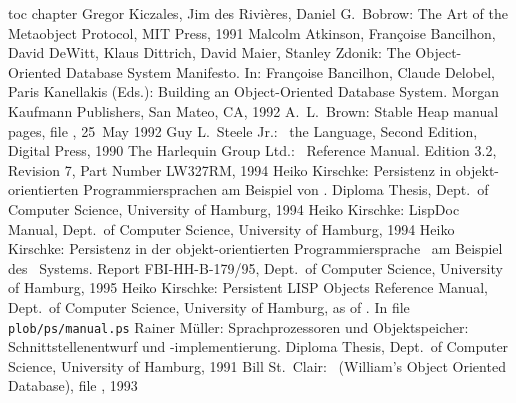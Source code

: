 %
\cleardoublepage
%
\newcommand{\etal}{et al.\ }
\newcommand{\infile}[1]{In file \texttt{#1}}
%
\begin{thebibliography}{XXXXXXXXXXXX}
\addcontentsline%
 {toc}%
 {chapter}%
 {\protect\numberline{}{\protect\bibname}}%
%
Gregor Kiczales, Jim des Rivi\`{e}res, Daniel G.\ Bobrow:
The Art of the Metaobject Protocol,
MIT Press, 1991
%
\bibitem[Atkinson \etal\ 92]{bib:Atkinson-et-al-92}
Malcolm Atkinson, Fran\c{c}oise Bancilhon, David DeWitt, Klaus
Dittrich, David Maier, Stanley Zdonik:
The Object-Oriented Database System Manifesto.
In: \cite[]{bib:Bancilhon-et-al-92}
%
\bibitem[Bancilhon \etal\ 92]{bib:Bancilhon-et-al-92}
Fran\c{c}oise Bancilhon, Claude Delobel, Paris Kanellakis (Eds.):
Building an Object-Oriented Database System.
Morgan Kaufmann Publishers, San Mateo, CA, 1992
%
A.\ L.\ Brown:
Stable Heap manual pages,
file ,
25~May 1992
%
Guy L.\ Steele Jr.:
\cl\ the Language, Second Edition,
Digital Press, 1990
%
The Harlequin Group Ltd.:
\lw\ Reference Manual.
Edition 3.2, Revision 7, Part Number LW327RM,
1994
%
Heiko Kirschke:
Persistenz in objekt-orientierten Programmiersprachen am Beispiel von
\clos.
Diploma Thesis,
Dept.\ of Computer Science, University of Hamburg,
1994
%
Heiko Kirschke:
LispDoc Manual,
Dept.\ of Computer Science, University of Hamburg,
1994
%
Heiko Kirschke:
Persistenz in der objekt-orientierten
Programmiersprache \clos\ am Beispiel
des \plob\ Systems.
Report FBI-HH-B-179/95,
Dept.\ of Computer Science, University of Hamburg,
1995
%
Heiko Kirschke:
Persistent LISP Objects Reference Manual,
Dept.\ of Computer Science, University of Hamburg,
as of \protect\mandate.
\infile{plob/\lb{}ps/\lb{}manual.ps}
%
Rainer M\"{u}ller:
Sprachprozessoren und Objektspeicher:
Schnittstellenentwurf und -implementierung.
Diploma Thesis,
Dept.\ of Computer Science, University of Hamburg,
1991
%
Bill St.\ Clair:
\wood\ (William's Object Oriented Database),
file , 1993
%
\end{thebibliography}

